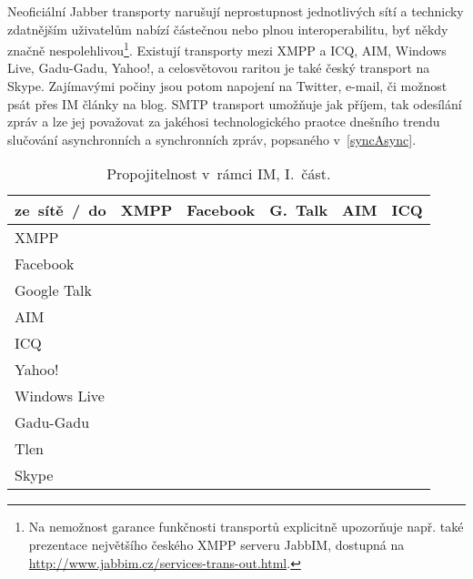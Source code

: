 \documentclass[12pt,oneside,final]{fithesis2}
\newcommand{\yes}{\scriptsize{\Checkmark}}
\newcommand{\no}{\scriptsize{\XSolidBrush}}
\begin{document}
Neoficiální Jabber transporty narušují neprostupnost jednotlivých sítí a technicky zdatnějším uživatelům nabízí částečnou nebo plnou interoperabilitu, byť někdy značně nespolehlivou\footnote{Na nemožnost garance funkčnosti transportů explicitně upozorňuje např. také prezentace největšího českého XMPP serveru JabbIM, dostupná na \url{http://www.jabbim.cz/services-trans-out.html}.}. Existují transporty mezi XMPP a ICQ, AIM, Windows Live, Gadu-Gadu, Yahoo!, a celosvětovou raritou je také český transport na Skype. Zajímavými počiny jsou potom napojení na Twitter, e-mail, či možnost psát přes IM články na blog. SMTP transport umožňuje jak příjem, tak odesílání zpráv a lze jej považovat za jakéhosi technologického praotce dnešního trendu slučování asynchronních a synchronních zpráv, popsaného v~\ref{syncAsync}.

\begin{table}[ht]
    \centering
    \begin{tabular}{ l | c c c c c }
        ze~sítě~/~do & XMPP & Facebook & G.~Talk & AIM & ICQ \\
        \hline
        XMPP         & \yes & \yes & \yes & \yes & \yes \\
        Facebook     & \no  & \yes & \no  & \no  & \no  \\
        Google Talk  & \yes & \yes & \yes & \yes & \yes \\
        AIM          & \no  & \yes & \yes & \yes & \yes \\
        ICQ          & \no  & \yes & \yes & \yes & \yes \\
        Yahoo!       & \no  & \no  & \no  & \no  & \no  \\
        Windows Live & \no  & \yes & \no  & \no  & \no  \\
        Gadu-Gadu    & \no  & \yes & \yes & \yes & \yes \\
        Tlen         & \no  & \no  & \no  & \no  & \no  \\
        Skype        & \no  & \yes & \no  & \no  & \no  \\
    \end{tabular}
    \caption{Propojitelnost v~rámci IM, I.~část.}
    \label{imIntegration1}
\end{table}
\end{document}
